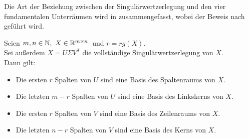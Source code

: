 Die Art der Beziehung zwischen der Singulärwertzerlegung und den vier fundamentalen Unterräumen wird in  zusammengefasst, wobei
der Beweis nach~\cite[S. 214~f.]{johnstonAdvancedLinearMatrix2021} geführt wird.
\begin{corollary}\label{cor:svd}
    Seien \(m,n\in\mathbb{N},\ X \in \mathbb{R}^{m \times n}\)\ und \(r = \textit{rg}(X)\).  \\
    Sei außerdem \(X = U \Sigma V^{T}\) die vollständige Singulärwertzerlegung von \(X\).\\    
    Dann gilt:
    \begin{itemize}
        \item Die ersten \(r\) Spalten von \(U\) sind eine Basis des Spaltenraums von \(X\).
        \item Die letzten \(m-r\) Spalten von \(U\) sind eine Basis des Linkskerns von \(X\).
        \item Die ersten \(r\) Spalten von \(V\) sind eine Basis des Zeilenraums von \(X\).
        \item Die letzten \(n - r\) Spalten von \(V\) sind eine Basis des Kerns von \(X\).          
    \end{itemize}
\end{corollary}
\enlargethispage{\baselineskip}%
